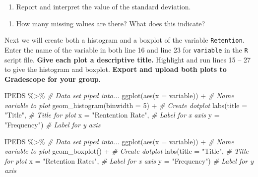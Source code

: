 \documentclass[
]{report}
\newenvironment{Shaded}{\begin{snugshade}}{\end{snugshade}}
\newcommand{\AttributeTok}[1]{\textcolor[rgb]{0.77,0.63,0.00}{#1}}
\newcommand{\CommentTok}[1]{\textcolor[rgb]{0.56,0.35,0.01}{\textit{#1}}}
\newcommand{\DecValTok}[1]{\textcolor[rgb]{0.00,0.00,0.81}{#1}}
\newcommand{\FunctionTok}[1]{\textcolor[rgb]{0.00,0.00,0.00}{#1}}
\newcommand{\NormalTok}[1]{#1}
\newcommand{\SpecialCharTok}[1]{\textcolor[rgb]{0.00,0.00,0.00}{#1}}
\newcommand{\StringTok}[1]{\textcolor[rgb]{0.31,0.60,0.02}{#1}}
\providecommand{\tightlist}{%
  \setlength{\itemsep}{0pt}\setlength{\parskip}{0pt}}
\begin{document}
\vspace{0.5in}

\begin{enumerate}
\def\labelenumi{\arabic{enumi}.}
\setcounter{enumi}{6}
\tightlist
\item
  Report and interpret the value of the standard deviation.
\end{enumerate}

\vspace{1in}

\begin{enumerate}
\def\labelenumi{\arabic{enumi}.}
\setcounter{enumi}{7}
\tightlist
\item
  How many missing values are there? What does this indicate?
\end{enumerate}

\vspace{0.8in}

Next we will create both a histogram and a boxplot of the variable \texttt{Retention}. Enter the name of the variable in both line 16 and line 23 for \texttt{variable} in the \texttt{R} script file. \textbf{Give each plot a descriptive title.} Highlight and run lines 15 -- 27 to give the histogram and boxplot. \textbf{Export and upload both plots to Gradescope for your group.}

\begin{Shaded}
\begin{Highlighting}[]
\NormalTok{IPEDS }\SpecialCharTok{\%\textgreater{}\%} \CommentTok{\# Data set piped into...}
\FunctionTok{ggplot}\NormalTok{(}\FunctionTok{aes}\NormalTok{(}\AttributeTok{x =}\NormalTok{ variable)) }\SpecialCharTok{+}   \CommentTok{\# Name variable to plot}
  \FunctionTok{geom\_histogram}\NormalTok{(}\AttributeTok{binwidth =} \DecValTok{5}\NormalTok{) }\SpecialCharTok{+}  \CommentTok{\# Create dotplot}
  \FunctionTok{labs}\NormalTok{(}\AttributeTok{title =} \StringTok{"Title"}\NormalTok{, }\CommentTok{\# Title for plot}
       \AttributeTok{x =} \StringTok{"Rentention Rate"}\NormalTok{, }\CommentTok{\# Label for x axis}
       \AttributeTok{y =} \StringTok{"Frequency"}\NormalTok{) }\CommentTok{\# Label for y axis}
\end{Highlighting}
\end{Shaded}

\begin{Shaded}
\begin{Highlighting}[]
\NormalTok{IPEDS }\SpecialCharTok{\%\textgreater{}\%} \CommentTok{\# Data set piped into...}
\FunctionTok{ggplot}\NormalTok{(}\FunctionTok{aes}\NormalTok{(}\AttributeTok{x =}\NormalTok{ variable)) }\SpecialCharTok{+}   \CommentTok{\# Name variable to plot}
  \FunctionTok{geom\_boxplot}\NormalTok{() }\SpecialCharTok{+}  \CommentTok{\# Create dotplot}
  \FunctionTok{labs}\NormalTok{(}\AttributeTok{title =} \StringTok{"Title"}\NormalTok{, }\CommentTok{\# Title for plot}
       \AttributeTok{x =} \StringTok{"Retention Rates"}\NormalTok{, }\CommentTok{\# Label for x axis}
       \AttributeTok{y =} \StringTok{"Frequency"}\NormalTok{) }\CommentTok{\# Label for y axis}
\end{Highlighting}
\end{Shaded}
\end{document}
